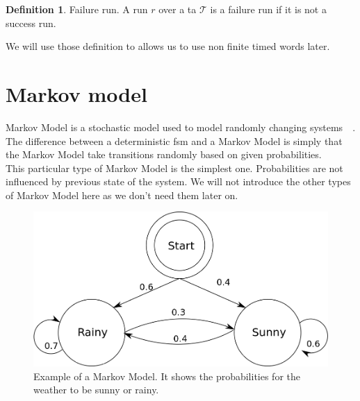 \documentclass[12pt]{article}
\theoremstyle{definition}
\newtheorem{definition}{Definition}[section]
\theoremstyle{definition}
\theoremstyle{remark}
\begin{document}
\begin{definition}{Failure run.} A run $r$ over a \gls{ta} $\mathcal{T}$ is a failure run if it is not a success run.
\end{definition}

We will use those definition to allows us to use non finite timed words later.



\section{Markov model}
\label{sec:markov}


Markov Model is a stochastic model used to model randomly changing systems~\cite{1165342}~\cite{MarkovModel:2017}. The difference between a deterministic \gls{fsm} and a Markov Model is simply that the Markov Model take transitions randomly based on given probabilities.\\

This particular type of Markov Model is the simplest one. Probabilities are not influenced by previous state of the system. We will not introduce the other types of Markov Model here as we don't need them later on.

\begin{figure}
    \centering
    \includegraphics[scale=1.6]{MarkovModel.png}
    \caption{Example of a Markov Model. It shows the probabilities for the weather to be sunny or rainy.}
    \label{MarkovModel}
\end{figure}


\end{document}
